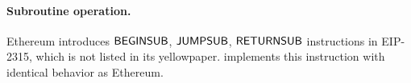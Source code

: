 
\paragraph{Subroutine operation.} Ethereum introduces $\mathsf{BEGINSUB}$, $\mathsf{JUMPSUB}$, $\mathsf{RETURNSUB}$ instructions in EIP-2315, which is not listed in its yellowpaper. 
{\name} implements this instruction with identical behavior as Ethereum.